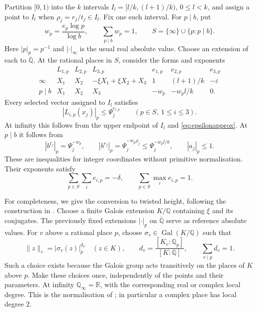 \documentclass[11pt]{article}
\numberwithin{equation}{section}
\theoremstyle{remark}
\newcommand{\Q}{\mathbb Q}
\newcommand{\R}{\mathbb R}
\newcommand{\Qbar}{\overline{\mathbb Q}}
\newcommand{\eps}{\varepsilon}
\DeclareMathOperator{\Gal}{Gal}
\begin{document}
Partition $[0,1)$ into the $k$ intervals
$I_l=[l/k,(l+1)/k)$, $0\le l<k$, and assign a point to $I_l$ when
$\rho_j=r_j/t_j\in I_l$.
Fix one such interval.
For $p\mid b$, put
\[
 w_p=\frac{e_p\log p}{\log b},\qquad
 \sum_{p\mid b}w_p=1,\qquad
 S=\{\infty\}\cup\{p:p\mid b\}.
\]
Here $|p|_p=p^{-1}$ and $|\cdot|_\infty$ is the usual real absolute
value. Choose an extension of each to $\Qbar$.
At the rational places in $S$, consider the forms and exponents
\begin{equation}\label{eq:raw}
\begin{array}{c|ccc|ccc}
 &L_{1,p}&L_{2,p}&L_{3,p}&e_{1,p}&e_{2,p}&e_{3,p}\\ \hline
 \infty&X_1&X_2&-\xi X_1+\xi X_2+X_3
       &1&(l+1)/k&-\eps\\
 p\mid b&X_1&X_2&X_3&-w_p&-w_pl/k&0 .
\end{array}
\end{equation}
Every selected vector assigned to $I_l$ satisfies
\begin{equation}\label{eq:rawineq}
 |L_{i,p}(x_j)|_p\le\Psi_j^{e_{i,p}}
 \qquad(p\in S,\ 1\le i\le3).
\end{equation}
At infinity this follows from the upper endpoint of $I_l$ and
\eqref{eq:epsilonapprox}. At $p\mid b$ it follows from
\[
 |b^{t_j}|_p=\Psi_j^{-w_p},\qquad
 |b^{r_j}|_p=\Psi_j^{-w_p\rho_j}\le\Psi_j^{-w_pl/k},
 \qquad |a_j|_p\le1.
\]
These are inequalities for integer coordinates without primitive
normalisation. Their exponents satisfy
\begin{equation}\label{eq:rawsums}
 \sum_{p\in S}\sum_i e_{i,p}=-\delta,\qquad
 \sum_{p\in S}\max_i e_{i,p}=1.
\end{equation}

For completeness, we give the conversion to twisted height, following
the construction in \cite[\S5, equations (5.14)--(5.17)]{BE08}.
Choose a finite Galois extension $K/\Q$ containing $\xi$ and its
conjugates. The previously fixed extensions $|\cdot|_p$ on $\Qbar$
serve as reference absolute values. For $v$ above a rational place $p$, choose
$\sigma_v\in\Gal(K/\Q)$ such that
\begin{equation}\label{eq:place}
 \|z\|_v=|\sigma_v(z)|_p^{d_v}\quad(z\in K),\qquad
 d_v=\frac{[K_v:\Q_p]}{[K:\Q]},\qquad
 \sum_{v\mid p}d_v=1.
\end{equation}
Such a choice exists because the Galois group acts transitively on
the places of $K$ above $p$. Make these choices once, independently
of the points and their parameters.
At infinity $\Q_\infty=\R$, with the corresponding real or complex
local degree. This is the normalisation of
\cite[\S1.1 and \S2.1, equations (2.1)--(2.3)]{EF13};
in particular a complex place has local degree $2$.
\end{document}
